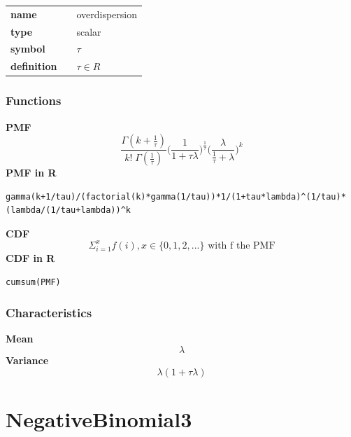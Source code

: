 \noindent\begin{tabular}{p{2cm}cl}
\textbf{name} & & overdispersion \\
\textbf{type} & & scalar \\
\textbf{symbol} & & $\tau$  \\
\textbf{definition} & & $\tau \in R$
\end{tabular}
\subsubsection*{Functions}

\smallskip \noindent \hspace{.2cm} \textbf{PMF} 
\begin{equation*}\frac{\Gamma(k + \frac{1}{\tau})}{k!\; \Gamma(\frac{1}{\tau})} \Big(\frac{1}{1+\tau \lambda} \Big)^{\frac{1}{\tau}} 
\Big(\frac{\lambda}{\frac{1}{\tau} + \lambda} \Big)^{k}\end{equation*}
\smallskip \noindent \hspace{.2cm} \textbf{PMF in R}  
\begin{verbatim}
gamma(k+1/tau)/(factorial(k)*gamma(1/tau))*1/(1+tau*lambda)^(1/tau)*(lambda/(1/tau+lambda))^k
\end{verbatim}
\smallskip \noindent \hspace{.2cm} \textbf{CDF} 
\begin{equation*}\Sigma_{i=1}^x f(i), x \in \{0,1,2,...\}
\text { with f the PMF}\end{equation*}
\smallskip \noindent \hspace{.2cm} \textbf{CDF in R}  
\begin{verbatim}
cumsum(PMF)
\end{verbatim}
\smallskip
\subsubsection*{Characteristics}
\smallskip \noindent \hspace{.2cm} \textbf{Mean} 
\begin{equation*}\lambda\end{equation*}
\smallskip \noindent \hspace{.2cm} \textbf{Variance} 
\begin{equation*}\lambda (1 + \tau \lambda)\end{equation*}
\smallskip
\section*{NegativeBinomial3} 

